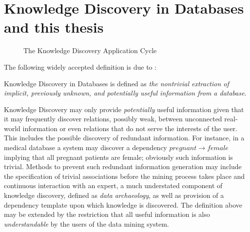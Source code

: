 \section{Knowledge Discovery in Databases and this thesis}\label{sec:int_kdd}

 
\begin{figure}
\centerline{}
\caption{\label{fig:kd_process}The Knowledge Discovery
Application Cycle}
\end{figure}

The following widely accepted definition is due to \cite{kdd96}:

\begin{definition}
\begin{rm} Knowledge Discovery in Databases is defined as {\em the nontrivial extraction of implicit, previously unknown, and potentially useful information from a database}.   
\end{rm}
\end{definition}

Knowledge Discovery may only provide {\em potentially} useful
information given that it may frequently discover relations, possibly
weak, between unconnected real-world information or even relations
that do not serve the interests of the user.  This includes the
possible discovery of redundant information. For instance, in a
medical database a system may discover a dependency $pregnant
\rightarrow female$ implying that all pregnant patients are female; obviously such information is trivial.  Methods
to prevent such redundant information generation may include the
specification of trivial associations before the mining process takes
place and continuous interaction with an expert, a much understated
component of knowledge discovery, defined as {\em data
archaeology}, as well as provision of a dependency template upon which
knowledge is discovered. The definition above may be extended by the restriction
that all useful information is also {\em understandable} by the users
of the data mining system. 

